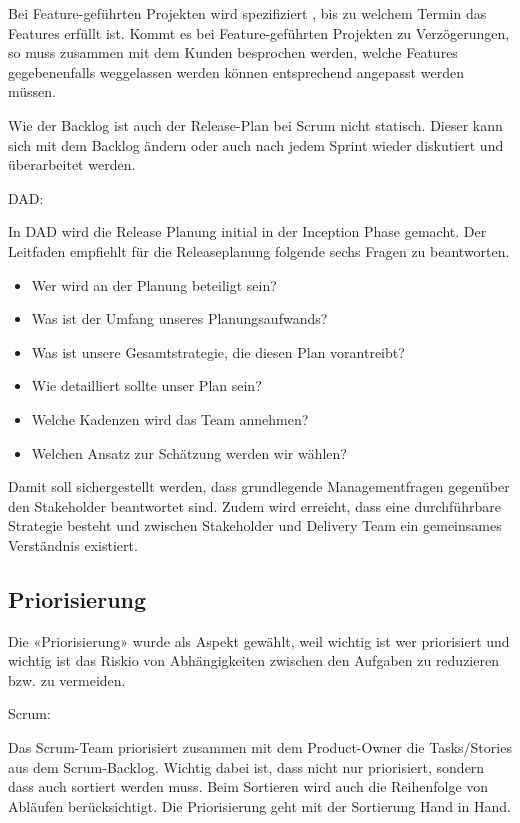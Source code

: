 Bei Feature-geführten Projekten wird spezifiziert , bis zu welchem Termin das Features erfüllt ist. Kommt es bei Feature-geführten Projekten zu Verzögerungen, so muss zusammen mit dem Kunden besprochen werden, welche Features gegebenenfalls weggelassen werden können entsprechend angepasst werden müssen.\smallskip

Wie der Backlog ist auch der Release-Plan bei Scrum nicht statisch. Dieser kann sich mit dem Backlog ändern oder auch nach jedem Sprint wieder diskutiert und überarbeitet werden.
\bigskip 

{\Large DAD:} \cite{planningReleaseDad} \medskip

In DAD wird die Release Planung initial in der Inception Phase gemacht. Der Leitfaden empfiehlt für die Releaseplanung folgende sechs Fragen zu beantworten.
\begin{itemize}
	\item Wer wird an der Planung beteiligt sein?
	\item Was ist der Umfang unseres Planungsaufwands?
	\item Was ist unsere Gesamtstrategie, die diesen Plan vorantreibt?
    \item Wie detailliert sollte unser Plan sein?
    \item Welche Kadenzen wird das Team annehmen?
    \item Welchen Ansatz zur Schätzung werden wir wählen?
\end{itemize}

Damit soll sichergestellt werden, dass grundlegende Managementfragen gegenüber den Stakeholder beantwortet sind. Zudem wird erreicht, dass eine durchführbare Strategie besteht und zwischen Stakeholder und Delivery Team ein gemeinsames Verständnis existiert.


\subsection{Priorisierung}

Die «Priorisierung» wurde als Aspekt gewählt, weil wichtig ist wer priorisiert und wichtig ist das Riskio von Abhängigkeiten zwischen den Aufgaben zu reduzieren bzw. zu vermeiden.

{\Large Scrum:} \cite{planningPrioScrum} \medskip

Das Scrum-Team priorisiert zusammen mit dem Product-Owner die Tasks/Stories aus dem Scrum-Backlog. Wichtig dabei ist, dass nicht nur priorisiert, sondern dass auch sortiert werden muss. Beim Sortieren wird auch die Reihenfolge von Abläufen berücksichtigt. Die Priorisierung geht mit der Sortierung Hand in Hand. \smallskip

